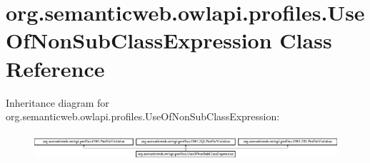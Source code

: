 \hypertarget{classorg_1_1semanticweb_1_1owlapi_1_1profiles_1_1_use_of_non_sub_class_expression}{\section{org.\-semanticweb.\-owlapi.\-profiles.\-Use\-Of\-Non\-Sub\-Class\-Expression Class Reference}
\label{classorg_1_1semanticweb_1_1owlapi_1_1profiles_1_1_use_of_non_sub_class_expression}
}
Inheritance diagram for org.\-semanticweb.\-owlapi.\-profiles.\-Use\-Of\-Non\-Sub\-Class\-Expression\-:\begin{figure}[H]
\begin{center}
\leavevmode
\includegraphics[height=0.987654cm]{classorg_1_1semanticweb_1_1owlapi_1_1profiles_1_1_use_of_non_sub_class_expression}
\end{center}
\end{figure}

